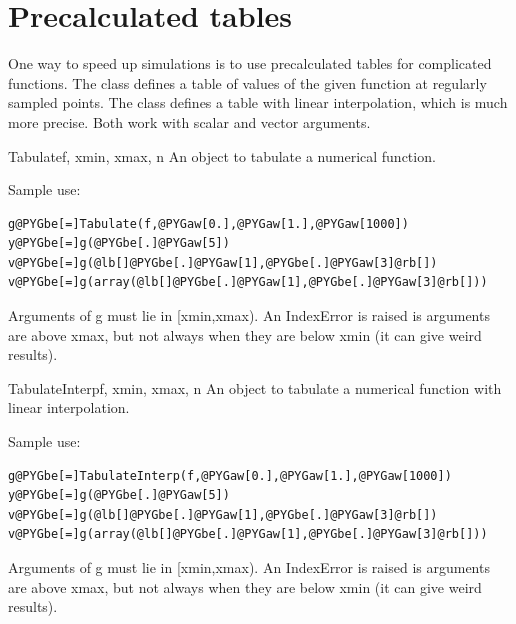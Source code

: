 \documentclass[letterpaper,10pt,english]{manual}
\begin{document}
\section{Precalculated tables}

One way to speed up simulations is to use precalculated tables for complicated
functions. The \hyperlink{brian.Tabulate}{} class defines a table of values of the
given function at regularly sampled points. The \hyperlink{brian.TabulateInterp}{} class
defines a table with linear interpolation, which is much more precise. Both work
with scalar and vector arguments.

\hypertarget{brian.Tabulate}{}\begin{classdesc}{Tabulate}{f, xmin, xmax, n}
An object to tabulate a numerical function.

Sample use:

\begin{Verbatim}[commandchars=@\[\]]
g@PYGbe[=]Tabulate(f,@PYGaw[0.],@PYGaw[1.],@PYGaw[1000])
y@PYGbe[=]g(@PYGbe[.]@PYGaw[5])
v@PYGbe[=]g(@lb[]@PYGbe[.]@PYGaw[1],@PYGbe[.]@PYGaw[3]@rb[])
v@PYGbe[=]g(array(@lb[]@PYGbe[.]@PYGaw[1],@PYGbe[.]@PYGaw[3]@rb[]))
\end{Verbatim}

Arguments of g must lie in {[}xmin,xmax).
An IndexError is raised is arguments are above xmax, but
not always when they are below xmin (it can give weird results).
\end{classdesc}

\hypertarget{brian.TabulateInterp}{}\begin{classdesc}{TabulateInterp}{f, xmin, xmax, n}
An object to tabulate a numerical function with linear interpolation.

Sample use:

\begin{Verbatim}[commandchars=@\[\]]
g@PYGbe[=]TabulateInterp(f,@PYGaw[0.],@PYGaw[1.],@PYGaw[1000])
y@PYGbe[=]g(@PYGbe[.]@PYGaw[5])
v@PYGbe[=]g(@lb[]@PYGbe[.]@PYGaw[1],@PYGbe[.]@PYGaw[3]@rb[])
v@PYGbe[=]g(array(@lb[]@PYGbe[.]@PYGaw[1],@PYGbe[.]@PYGaw[3]@rb[]))
\end{Verbatim}

Arguments of g must lie in {[}xmin,xmax).
An IndexError is raised is arguments are above xmax, but
not always when they are below xmin (it can give weird results).
\end{classdesc}
\end{document}
